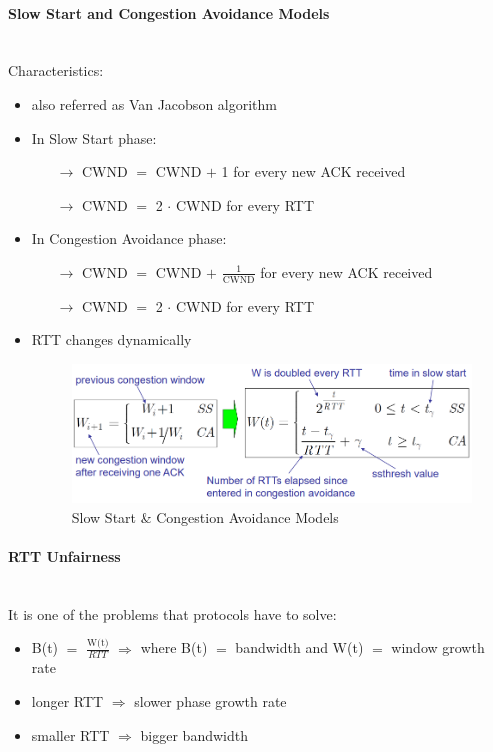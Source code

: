 \paragraph{Slow Start and Congestion Avoidance Models}\mbox{}\\[0.2cm]
Characteristics:
\begin{itemize}
    \item also referred as Van Jacobson algorithm
    \item In Slow Start phase:
    \begin{itemize}
        \item[$\rightarrow$] CWND $=$ CWND $+$ 1 for every new ACK received
        \item[$\rightarrow$] CWND $=$ 2 $\cdot$ CWND for every RTT
    \end{itemize} 
    \item In Congestion Avoidance phase:
    \begin{itemize}
        \item[$\rightarrow$] CWND $=$ CWND $+$ $\frac{\text{1}}{\text{CWND}}$ for every new
        ACK received
        \item[$\rightarrow$] CWND $=$ 2 $\cdot$ CWND for every RTT
    \end{itemize}
    \item RTT changes dynamically
    \begin{figure}[!h] 
        \centering 
        \includegraphics[scale = 0.37]{images/ss-ca-formulas.png} 
        \caption{Slow Start \& Congestion Avoidance Models}
        \label{ss-ca-formulas}
    \end{figure}
\end{itemize}

\paragraph{RTT Unfairness}\mbox{}\\[0.2cm]
It is one of the problems that protocols have to solve:
\begin{itemize}
    \item B(t) $=$ $\frac{\text{W(t)}}{RTT}$ $\Rightarrow$ where B(t) $=$ bandwidth and 
    W(t) $=$ window growth rate
    \item longer RTT $\Rightarrow$ slower phase growth rate
    \item smaller RTT $\Rightarrow$ bigger bandwidth
\end{itemize}

